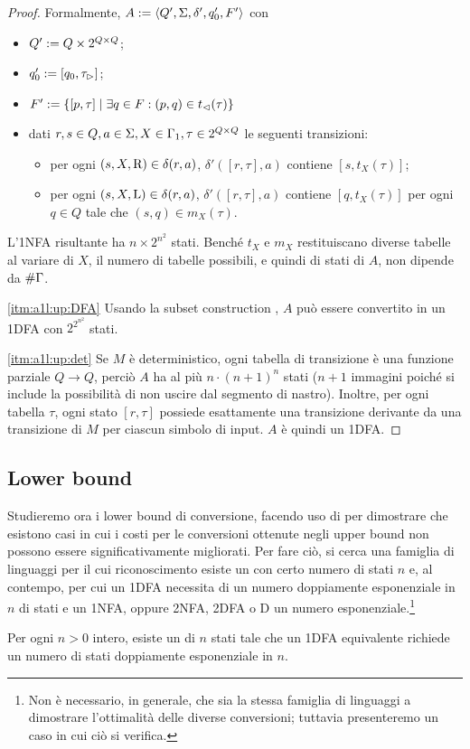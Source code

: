 \begin{proof}
	Formalmente, $A:=\langle Q',\Sigma,\delta',q_0',F' \rangle$ con
	\begin{itemize}
		\item $Q':=Q\times2^{Q\times Q}$;
		\item $q_0':=[q_0,\tau_\rhd]$;
		\item $F':=\left\{ [p,\tau]\mid \exists q\in F: (p,q)\in t_\lhd(\tau) \right\}$
		\item dati $r,s\in Q,a\in\Sigma,X\in\Gamma_1,\tau\in2^{Q\times Q}$ le seguenti transizioni:
		      \begin{itemize}
			      \item per ogni $(s,X,\mathrm R)\in\delta(r,a)$, $\delta'([r,\tau],a)$ contiene $[s,t_X(\tau)]$;
			      \item per ogni $(s,X,\mathrm L)\in\delta(r,a)$, $\delta'([r,\tau],a)$ contiene $[q,t_X(\tau)]$ per ogni $q\in Q$ tale che $(s,q)\in m_X(\tau)$.
		      \end{itemize}
	\end{itemize}
	L'1NFA risultante ha $n\times 2^{n^2}$ stati. Benché $t_X$ e $m_X$ restituiscano diverse tabelle al variare di $X$, il numero di tabelle possibili, e quindi di stati di $A$, non dipende da $\# \Gamma$.

	\ref{itm:a1l:up:DFA} Usando la subset construction \cite{Rabin:59:NFA}, $A$ può essere convertito in un 1DFA con $2^{2^{n^2}}$ stati.

	\ref{itm:a1l:up:det} Se $M$ è deterministico, ogni tabella di transizione è una funzione parziale $Q\to Q$, perciò $A$ ha al più $n\cdot(n+1)^n$ stati ($n+1$ immagini poiché si include la possibilità di non uscire dal segmento di nastro). Inoltre, per ogni tabella $\tau$, ogni stato $[r,\tau]$ possiede esattamente una transizione derivante da una transizione di $M$ per ciascun simbolo di input. $A$ è quindi un 1DFA.
\end{proof}


\subsection{Lower bound}\label{subs:a1l:low}
Studieremo ora i lower bound di conversione, facendo uso di  per dimostrare che esistono casi in cui i costi per le conversioni ottenute negli upper bound non possono essere significativamente migliorati. Per fare ciò, si cerca una famiglia di linguaggi per il cui riconoscimento esiste un  con certo numero di stati $n$ e, al contempo, per cui un 1DFA necessita di un numero doppiamente esponenziale in $n$ di stati e un 1NFA, oppure 2NFA, 2DFA o D un numero esponenziale.\footnote{Non è necessario, in generale, che sia la stessa famiglia di linguaggi a dimostrare l'ottimalità delle diverse conversioni; tuttavia presenteremo un caso in cui ciò si verifica.}
\begin{theor}
	Per ogni $n>0$ intero, esiste un  di $n$ stati tale che un 1DFA equivalente richiede un numero di stati doppiamente esponenziale in $n$.
\end{theor}

